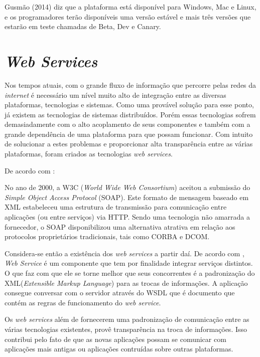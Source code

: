 	\par Gusmão (2014) diz que a plataforma está disponível para Windows, Mac e
Linux, e os programadores terão disponíveis uma versão estável e mais três
versões que estarão em teste chamadas de Beta, Dev e Canary.


\section{\textit{Web Services}}
	
	\par Nos tempos atuais, com o grande fluxo de informação que percorre pelas
redes da \textit{internet} é necessário um nível muito alto de integração entre
as diversas plataformas, tecnologias e sistemas. Como uma provável solução para
esse ponto, já existem as tecnologias de sistemas distribuídos. Porém essas
tecnologias sofrem demasiadamente com o alto acoplamento de seus componentes e
também com a grande dependência de uma plataforma para que possam funcionar. Com
intuito de solucionar a estes problemas e proporcionar alta transparência entre
as várias plataformas, foram criados as tecnologias \textit{web services}.
	
	\par De acordo com :
	\begin{citacao}
		No ano de 2000, a W3C (\textit{World Wide Web Consortium}) aceitou a submissão
		do \textit{Simple Object Access Protocol} (SOAP). Este formato de mensagem
		baseado em XML estabeleceu uma estrutura de transmissão para comunicação entre
		aplicações (ou entre serviços) via HTTP. Sendo uma tecnologia não amarrada a
		fornecedor, o SOAP disponibilizou uma alternativa atrativa em relação aos
		protocolos proprietários tradicionais, tais como CORBA e DCOM.
	\end{citacao}
	
	\par Considera-se então a existência dos \textit{web services} a partir daí. De
acordo com , \textit{Web Service} é um componente que
tem por finalidade integrar serviços distintos. O que faz com que ele se torne
melhor que seus concorrentes é a padronização do XML(\textit{Extensible Markup
Language}) para as trocas de informações. A aplicação consegue conversar com o
servidor através do WSDL que é documento que contém as regras de funcionamento
do \textit{web service}.
	
	\par Os \textit{web services} além de fornecerem uma padronização de
comunicação entre as várias tecnologias existentes, provê transparência na
troca de informações. Isso contribui pelo fato de que as novas aplicações
possam se comunicar com aplicações mais antigas ou aplicações contruídas sobre
outras plataformas.

